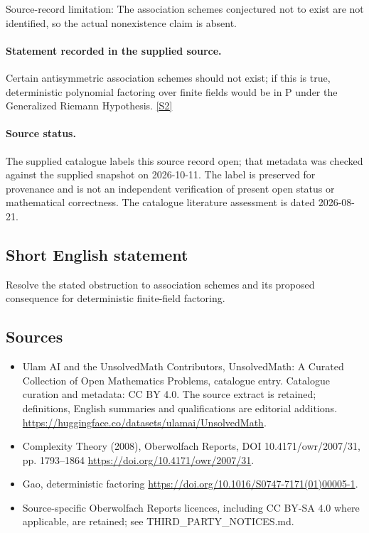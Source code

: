 \documentclass[11pt]{article}
\begin{document}
Source-record limitation: The association schemes conjectured not to exist are not identified, so the actual nonexistence claim is absent.
\paragraph{Statement recorded in the supplied source.}
Certain antisymmetric association schemes should not exist; if this is true, deterministic polynomial factoring over finite fields would be in $\mathrm{P}$ under the Generalized Riemann Hypothesis. \href{https://doi.org/10.4171/owr/2007/31}{[S2]}
\paragraph{Source status.}
The supplied catalogue labels this source record open; that metadata was checked against the supplied snapshot on 2026-10-11. The label is preserved for provenance and is not an independent verification of present open status or mathematical correctness. The catalogue literature assessment is dated 2026-08-21.
\subsection{Short English statement}
Resolve the stated obstruction to association schemes and its proposed consequence for deterministic finite-field factoring.
\subsection{Sources}
\begin{itemize}
\item[S1] Ulam AI and the UnsolvedMath Contributors, UnsolvedMath: A Curated Collection of Open Mathematics Problems, catalogue entry. Catalogue curation and metadata: CC BY 4.0. The source extract is retained; definitions, English summaries and qualifications are editorial additions.
\url{https://huggingface.co/datasets/ulamai/UnsolvedMath}.
\item[S2] Complexity Theory (2008), Oberwolfach Reports, DOI 10.4171/owr/2007/31, pp. 1793--1864
\url{https://doi.org/10.4171/owr/2007/31}.
\item[S3] Gao, deterministic factoring
\url{https://doi.org/10.1016/S0747-7171(01)00005-1}.
\item Source-specific Oberwolfach Reports licences, including CC BY-SA 4.0 where applicable, are retained; see THIRD\_PARTY\_NOTICES.md.
\end{itemize}
\end{document}
